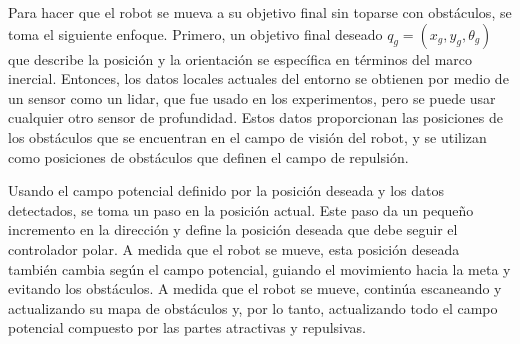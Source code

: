 Para hacer que el robot se mueva a su objetivo final sin toparse con obstáculos, se 
toma el siguiente enfoque. Primero, un objetivo final deseado $q_{g} =(x_{g}, y_{g}, 
\theta_{g})$ que describe la posición y la orientación se específica en términos del 
marco inercial. Entonces, los datos locales actuales del entorno se obtienen por medio 
de un sensor como un lidar, que fue usado en los experimentos, pero se puede usar cualquier 
otro sensor de profundidad. Estos datos proporcionan las posiciones de los obstáculos que 
se encuentran en el campo de visión del robot, y se utilizan como posiciones de obstáculos 
que definen el campo de repulsión.

Usando el campo potencial definido por la posición deseada y los datos detectados, se toma un paso 
en la posición actual. Este paso da un pequeño incremento en la dirección y define la 
posición deseada que debe seguir el controlador polar. A medida que el robot se mueve, esta 
posición deseada también cambia según el campo potencial, guiando el movimiento hacia la meta 
y evitando los obstáculos. A medida que el robot se mueve, continúa escaneando y actualizando 
su mapa de obstáculos y, por lo tanto, actualizando todo el campo potencial compuesto por las 
partes atractivas y repulsivas.

